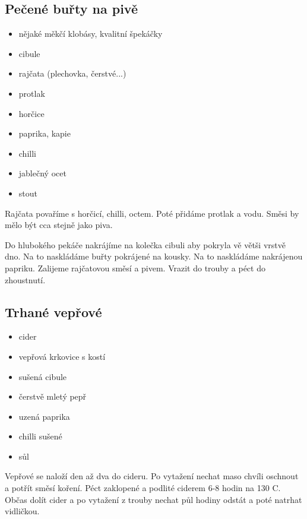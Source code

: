 \documentclass[10pt,a4paper]{article}
\newenvironment{myitemize}
{ \begin{itemize}
    \setlength{\itemsep}{0pt}
    \setlength{\parskip}{0pt}
    \setlength{\parsep}{0pt}     }
{ \end{itemize}                  }
\begin{document}
\subsection{Pečené buřty na pivě}
\begin{minipage}[t]{0,5\textwidth}
\begin{myitemize} 
\item nějaké měkčí klobásy, kvalitní špekáčky
\item cibule
\item rajčata (plechovka, čerstvé...)
\item protlak
\item horčice
\item paprika, kapie
\item chilli
\item jablečný ocet
\item stout
\end{myitemize}
\end{minipage}
\begin{minipage}[t]{0,5\textwidth}
Rajčata povaříme s horčicí, chilli, octem. Poté přidáme protlak a vodu. Směsi by mělo být cca stejně jako piva. 

Do hlubokého pekáče nakrájíme na kolečka cibuli aby pokryla vě větši vrstvě dno. Na to naskládáme buřty pokrájené na kousky. Na to naskládáme nakrájenou papriku. Zalijeme rajčatovou směsí a pivem. Vrazit do trouby a péct do zhoustnutí.
\end{minipage}

\subsection{Trhané vepřové} \label{pulledpork}
\begin{minipage}[t]{0,5\textwidth}
\begin{myitemize} 
\item cider
\item vepřová krkovice s kostí
\item sušená cibule
\item čerstvě mletý pepř
\item uzená paprika
\item chilli sušené
\item sůl
\end{myitemize}
\end{minipage}
\begin{minipage}[t]{0,5\textwidth}
Vepřové se naloží den až dva do cideru. Po vytažení nechat maso chvíli oschnout a potřít směsí koření. Péct zaklopené a podlité ciderem 6-8 hodin na 130 \degree C. Občas dolít cider a po vytažení z trouby nechat půl hodiny odstát a poté natrhat vidličkou.
\end{minipage}
\end{document}
